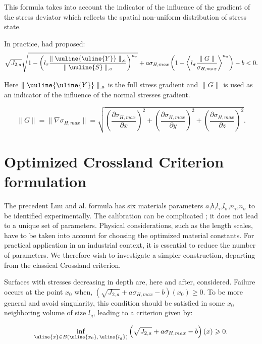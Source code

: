 This formula takes into account the indicator of the influence of the gradient of the stress deviator which reflects the spatial non-uniform distribution of stress state.

In practice, \cite{luu2014formulation} had proposed:
\begin{equation}
	\sqrt{{J_{2,a}}}\sqrt{1-\left(l_\tau\dfrac{\parallel \uuline{\uline{Y}}\parallel_{,a}}{\parallel \uuline{S}\parallel_{,a}}\right)^{n_\tau}}+a\sigma_{H,max}\left(1-\left\langle  l_\sigma\dfrac{\parallel G\parallel}{\sigma_{H,max}}\right\rangle ^{n_\sigma}\right)-b < 0 .
\end{equation}

Here $\parallel \uuline{\uline{Y}}\parallel_{,a}$ is the full stress gradient and $\parallel G\parallel$ is used as an indicator of the influence of the normal stresses gradient.

\begin{equation}
	\parallel{G}\parallel=\parallel{\nabla \sigma_{H,max}}\parallel=\sqrt{\left(\dfrac{\partial \sigma_{H,max}}{\partial x}\right)^2+\left(\dfrac{\partial \sigma_{H,max}}{\partial y}\right)^2+\left(\dfrac{\partial \sigma_{H,max}}{\partial z}\right)^2} .
\end{equation}



\section{Optimized Crossland Criterion formulation}
The precedent Luu and al. formula has six materials parameters $a$,$b$,$l_\tau$,$l_\sigma$,$n_\tau$,$n_\sigma$ to be identified experimentally. The calibration can be complicated ; it does not lead to a unique set of parameters. Physical considerations, such as the length scales, have to be taken into account for choosing the optimized material constants. For practical application in an industrial context, it is essential to reduce the number of parameters. We therefore wish to investigate a simpler construction, departing from the classical Crossland criterion.

Surfaces with stresses decreasing in depth are, here and after, considered. Failure occurs at the point $x_0$ when,  $(\sqrt{J_{2,a}}+a\sigma_{H,max}-b)(x_0)\geqslant 0 $. To be more general and avoid singularity, this condition should be satisfied in some $x_0$ neighboring volume of size $l_g$, leading to a criterion given by:

\begin{equation}
	\inf\limits_{\uline{x}\in B\left( \uline{x_0},\,\uline{l_g}\right) }\left( \sqrt{J_{2,a}}+a\sigma_{H,max}-b\right) (x)\geqslant 0 .
	\label{crossland-x0-2}
\end{equation}

